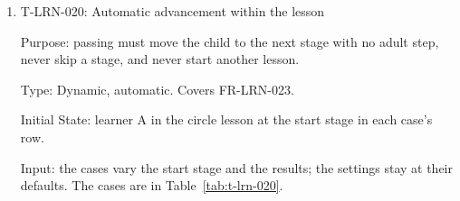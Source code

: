 \documentclass[12pt, titlepage]{article}
\newcommand{\testitem}[1]{\item #1\par\nopagebreak}
\begin{document}
\begin{enumerate}
Test Case Derivation: the fit criterion (inspect all feedback and
completion outcomes using prepared attempts). The terms come from:
\begin{itemize}
\item Hazard Analysis H-MOU-002: ``wrong'', ``bad'', ``fail'' and
``mistake'';
\item T-SAF-004: ``struggling'', ``behind'' and ``below average'';
\item SRS NFR-UX-017: ``diagnosis'', ``disorder'', ``delay'', ``score'' and
``rank'';
\item ability and comparison words: ``smart'', ``clever'', ``talented'',
``slow'', ``better than'', ``worse than'' and ``other children''.
\end{itemize}

How test will be performed: (a) at PH-1, Rev~0 and Rev~1, and in PR review
whenever catalogue text changes; findings become GitHub issues.
(b) in CI.

\testitem{T-LRN-020: Automatic advancement within the lesson}

Purpose: passing must move the child to the next stage with no adult step,
never skip a stage, and never start another lesson.

Type: Dynamic, automatic. Covers FR-LRN-023.

Initial State: learner A in the circle lesson at the start stage in each
case's row.

Input: the cases vary the start stage and the results; the settings stay
at their defaults. The cases are in Table~\ref{tab:t-lrn-020}.


\end{enumerate}
\end{document}
